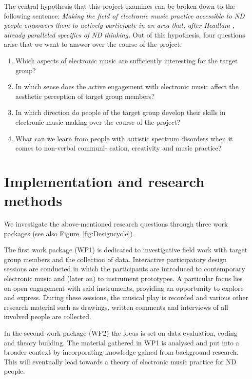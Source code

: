 \documentclass{chi-ext}
\begin{document}
\begin{multicols}{2}

The central hypothesis that this project examines can be broken down to the following sentence: 
\emph{Making the field of electronic music practice accessible to ND people empowers them to actively participate in an area that, after Headlam \cite{headlam2006-lea}, already paralleled specifics of ND thinking.}
Out of this hypothesis, four questions arise that we want to answer over the course of the project:

\begin{enumerate}
	\item Which aspects of electronic music are sufficiently interesting for the target group?
	\item In which sense does the active engagement with electronic music affect the aesthetic perception of target group members?
	\item In which direction do people of the target group develop their skills in electronic music making over the course of the project?
	\item What can we learn from people with autistic spectrum disorders when it comes to non-verbal communi- cation, creativity and music practice?
\end{enumerate}

\section{Implementation and research methods}
\label{sec:timeline}


We investigate the above-mentioned research questions through three work packages (see also  Figure~\ref{fig:Designcycle}).

The first work package (WP1) is dedicated to investigative field work with target group members and the collection of data.
Interactive participatory design sessions are conducted in which the participants are introduced to contemporary electronic music and (later on) to instrument prototypes. 
A particular focus lies on open engagement with said instruments, providing an opportunity to explore and express.
During these sessions, the musical play is recorded and various other research material such as drawings, written comments and interviews of all involved people are collected.

In the second work package (WP2) the focus is set on data evaluation, coding and theory building.
The material gathered in WP1 is analysed and put into a broader context by incorporating knowledge gained from background research.
This will eventually lead towards a theory of electronic music practice for ND people.


\end{multicols}
\end{document}
